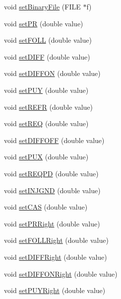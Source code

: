 \begin{DoxyCompactItemize}
void \hyperlink{classdevice2yarp_a1982c1021d9e51c789dfc5369dcb46bf}{set\+Binary\+File} (F\+I\+LE $\ast$f)
\item 
void \hyperlink{classdevice2yarp_a88ab89295bfefefbc9ac225dd5078dec}{set\+PR} (double value)
\item 
void \hyperlink{classdevice2yarp_a96f85845d4902b017e7d082cbc736735}{set\+F\+O\+LL} (double value)
\item 
void \hyperlink{classdevice2yarp_a813be66e7621e575682f44e92efa20ef}{set\+D\+I\+FF} (double value)
\item 
void \hyperlink{classdevice2yarp_ac072c8cf5341ae1bb187eacbaf8bc439}{set\+D\+I\+F\+F\+ON} (double value)
\item 
void \hyperlink{classdevice2yarp_a263fc557cd4333c9cff0e9e4a3f283cd}{set\+P\+UY} (double value)
\item 
void \hyperlink{classdevice2yarp_a24d972c0905025758a9d25607feaccf3}{set\+R\+E\+FR} (double value)
\item 
void \hyperlink{classdevice2yarp_add886f7ed984d3b47788df4cd294f2bc}{set\+R\+EQ} (double value)
\item 
void \hyperlink{classdevice2yarp_a202830f7c13eaff007c2594cc5e1d1ba}{set\+D\+I\+F\+F\+O\+FF} (double value)
\item 
void \hyperlink{classdevice2yarp_a1e9703e924441f50217aa4ded2be6c57}{set\+P\+UX} (double value)
\item 
void \hyperlink{classdevice2yarp_aea2c1f8287d1f9e95ac1ff2dc5ed878b}{set\+R\+E\+Q\+PD} (double value)
\item 
void \hyperlink{classdevice2yarp_afaf4e9eba2aa0d2f08602b7a03c6e5bf}{set\+I\+N\+J\+G\+ND} (double value)
\item 
void \hyperlink{classdevice2yarp_a469e0006636382fb25380147e146114f}{set\+C\+AS} (double value)
\item 
void \hyperlink{classdevice2yarp_a223f809aba867489a6b95c3b1ff66b15}{set\+P\+R\+Right} (double value)
\item 
void \hyperlink{classdevice2yarp_a27c6f1f15ceed7423118303431c9b54c}{set\+F\+O\+L\+L\+Right} (double value)
\item 
void \hyperlink{classdevice2yarp_add9e9df708995e75461d4589aae966c2}{set\+D\+I\+F\+F\+Right} (double value)
\item 
void \hyperlink{classdevice2yarp_aba1778322dffc46348dd78f0b86e56b0}{set\+D\+I\+F\+F\+O\+N\+Right} (double value)
\item 
void \hyperlink{classdevice2yarp_a0e60d43576b2d8f9c26519d09a14a564}{set\+P\+U\+Y\+Right} (double value)

\end{DoxyCompactItemize}
